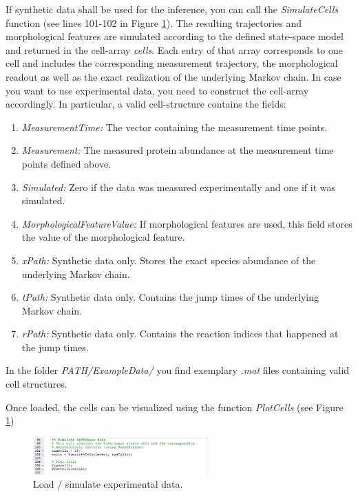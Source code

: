 \documentclass[a4paper, 9pt]{scrartcl}
\begin{document}
If synthetic data shall be used for the inference, you can call the \textit{SimulateCells} function (see lines 101-102 in Figure \ref{fig:TargetData}). The resulting trajectories and morphological features are simulated according to the defined state-space model and returned in the cell-array \textit{cells}. Each entry of that array corresponds to one cell and includes the corresponding measurement trajectory, the morphological readout as well as the exact realization of the underlying Markov chain. In case you want to use experimental data, you need to construct the cell-array accordingly. In particular, a valid cell-structure contains the fields:
\begin{enumerate}
	\item \textit{MeasurementTime:} The vector containing the measurement time points.
	\item \textit{Measurement:} The measured protein abundance at the measurement time points defined above.
	\item \textit{Simulated:} Zero if the data was measured experimentally and one if it was simulated.
	\item \textit{MorphologicalFeatureValue:} If morphological features are used, this field stores the value of the morphological feature.
	\item \textit{xPath:} Synthetic data only. Stores the exact species abundance of the underlying Markov chain.
	\item \textit{tPath:} Synthetic data only. Contains the jump times of the underlying Markov chain.
	\item \textit{rPath:} Synthetic data only. Contains the reaction indices that happened at the jump times.
\end{enumerate}
In the folder \textit{PATH/ExampleData/} you find exemplary \textit{.mat} files containing valid cell structures.

Once loaded, the cells can be visualized using the function \textit{PlotCells} (see Figure \ref{fig:TargetData})

\begin{figure}[htbp]
\begin{center}
	\includegraphics[width=0.6\textwidth]{figures/Doc_TargetData}
\caption{Load / simulate experimental data.}
\label{fig:TargetData}
\end{center}
\end{figure}
\end{document}
